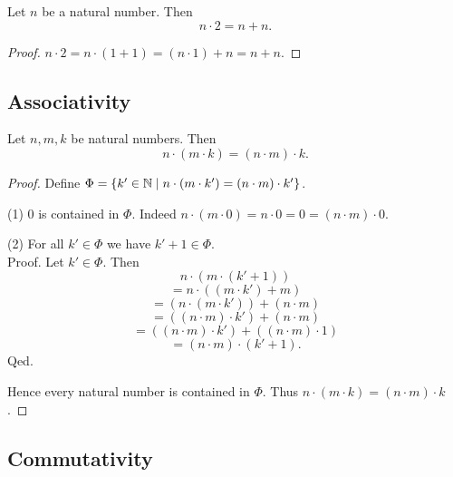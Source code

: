 \documentclass[10pt]{article}
\begin{document}
  \begin{forthel}
    \begin{corollary}
      Let $n$ be a natural number.
      Then \[ n \cdot 2 = n + n. \]
    \end{corollary}
    \begin{proof}
      $n \cdot 2
        = n \cdot (1 + 1)
        = (n \cdot 1) + n
        = n + n$.
    \end{proof}
  \end{forthel}


  \subsection{Associativity}

  \begin{forthel}
    \begin{proposition}
      Let $n, m, k$ be natural numbers.
      Then \[ n \cdot (m \cdot k) = (n \cdot m) \cdot k. \]
    \end{proposition}
    \begin{proof}
      Define $\Phi = \{ k' \in \mathbb{N} \mid n \cdot (m \cdot k') =
      (n \cdot m) \cdot k' \}$.

      (1) $0$ is contained in $\Phi$.
      Indeed $n \cdot (m \cdot 0)
        = n \cdot 0
        = 0
        = (n \cdot m) \cdot 0$.

      (2) For all $k' \in \Phi$ we have $k' + 1 \in \Phi$. \\
      Proof.
        Let $k' \in \Phi$.
        Then
        \[  n \cdot (m \cdot (k' + 1))                          \]
        \[    = n \cdot ((m \cdot k') + m)                      \]
        \[    = (n \cdot (m \cdot k')) + (n \cdot m)            \]
        \[    = ((n \cdot m) \cdot k') + (n \cdot m)            \]
        \[    = ((n \cdot m) \cdot k') + ((n \cdot m) \cdot 1)  \]
        \[    = (n \cdot m) \cdot (k' + 1).                     \]
      Qed.

      Hence every natural number is contained in $\Phi$.
      Thus $n \cdot (m \cdot k) = (n \cdot m) \cdot k$.
    \end{proof}
  \end{forthel}


  \subsection{Commutativity}
\end{document}
